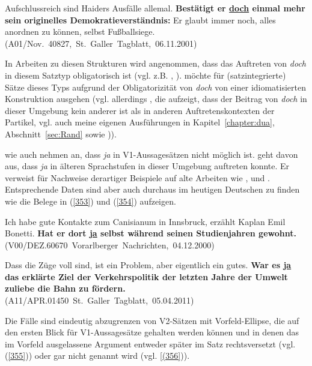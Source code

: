 \begin{exe}
	\ex\label{352} 
	\scriptsize
	Aufschlussreich sind Haiders Ausfälle allemal. \textbf{Bestätigt er \underline{doch} einmal mehr sein originelles Demo\-kratieverständnis:} Er glaubt 		immer noch, alles anordnen zu können, selbst Fußballsiege.  
	\newline
	\hbox{}\hfill\hbox{(A01/Nov. 40827, St. Galler Tagblatt, 06.11.2001) \citet[157]{Pittner2011}}	
\end{exe}
In Arbeiten zu diesen Strukturen wird angenommen, dass das Auftreten von \textit{doch} in diesem Satztyp obligatorisch ist (vgl. z.B. \citealt[295]{Oennerfors1997}, \citealt[172]{Pittner2011}). \citet[174]{Rinas2006} möchte für (satzintegrierte) Sätze dieses Typs aufgrund der Obligatorizität von \textit{doch} von einer idiomatisierten Konstruktion ausgehen (vgl. allerdings \citealt[162-169]{Pittner2011}, die aufzeigt, dass der Beitrag von \textit{doch} in dieser Umgebung kein anderer ist als in anderen Auftretenskontexten der Partikel, vgl. auch meine eigenen Ausführungen in Kapitel~\ref{chapter:dua}, Abschnitt~\ref{sec:Rand} sowie \citealt{MuellerimDruck})).

\citet[174]{Rinas2006} wie auch \citet[90]{Kwon2005} nehmen an, dass \textit{ja} in V1-Aussagesät\-zen  nicht möglich ist. \citet[158]{Oennerfors1997} geht davon aus, dass \textit{ja} in älteren Sprachstufen in dieser Umgebung auftreten konnte. Er verweist für Nachweise derartiger Beispiele auf alte Arbeiten wie \citet[74-75]{Sanders1883}, \citet[36-37]{Stenstad1917} und \citet[70-71]{Mattausch1965}. Entsprechende Daten sind aber auch durch\-aus im heutigen Deutschen zu finden wie die Belege in (\ref{353}) und (\ref{354}) aufzeigen.

\begin{exe}
	\ex\label{353} 
	\scriptsize
	\glqq Ich habe gute Kontakte zum Canisianum in Innsbruck\grqq{}, erzählt Kaplan Emil Bonetti. \textbf{Hat er dort \underline{ja} selbst während seinen 	Studienjahren gewohnt. }
	\newline
	\hbox{}\hfill\hbox{(V00/DEZ.60670 Vorarlberger Nachrichten, 04.12.2000)}	
\end{exe}

\begin{exe}
	\ex\label{354} 
	\scriptsize
	Dass die Züge voll sind, ist ein Problem, aber eigentlich ein gutes. \textbf{War es \underline{ja} das erklärte Ziel der Verkehrspolitik der letzten 		Jahre der Umwelt zuliebe die Bahn zu fördern.}
	\newline
	\hbox{}\hfill\hbox{(A11/APR.01450 St. Galler Tagblatt, 05.04.2011)}	
\end{exe}
Die Fälle sind eindeutig abzugrenzen von V2-Sätzen mit Vorfeld-Ellipse, die auf den ersten Blick für V1-Aussagesätze gehalten werden können und in denen das im Vorfeld ausgelassene Argument entweder später im Satz rechtsversetzt (vgl. (\ref{355})) oder gar nicht genannt wird (vgl. \ref{(356})).
	
